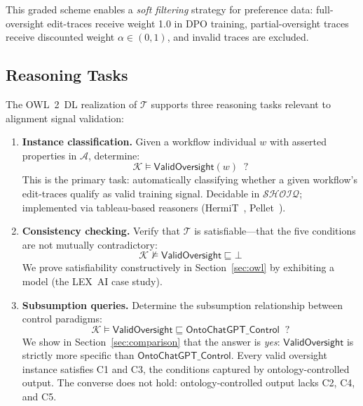 \documentclass[11pt]{article}
\newcommand{\DL}{\ensuremath{\mathcal{SHOIQ}}\xspace}
\newcommand{\TBox}{\ensuremath{\mathcal{T}}\xspace}
\newcommand{\ABox}{\ensuremath{\mathcal{A}}\xspace}
\newcommand{\KB}{\ensuremath{\mathcal{K}}\xspace}
\newcommand{\sqsub}{\sqsubseteq}
\begin{document}
This graded scheme enables a \emph{soft filtering} strategy for preference data: full-oversight edit-traces receive weight 1.0 in DPO training, partial-oversight traces receive discounted weight $\alpha \in (0, 1)$, and invalid traces are excluded.

\subsection{Reasoning Tasks}
\label{sec:reasoning}

The OWL~2~DL realization of \TBox supports three reasoning tasks relevant to alignment signal validation:

\begin{enumerate}[label=\textbf{R\arabic*.},leftmargin=2.5em]

\item \textbf{Instance classification.}
Given a workflow individual $w$ with asserted properties in \ABox, determine:
\begin{equation}
  \KB \models \mathsf{ValidOversight}(w) \;\; ?
\end{equation}
This is the primary task: automatically classifying whether a given workflow's edit-traces qualify as valid training signal.
Decidable in \DL; implemented via tableau-based reasoners (HermiT~\citep{glimm2014hermit}, Pellet~\citep{sirin2007pellet}).

\item \textbf{Consistency checking.}
Verify that \TBox is satisfiable---that the five conditions are not mutually contradictory:
\begin{equation}
  \KB \not\models \mathsf{ValidOversight} \sqsub \bot
\end{equation}
We prove satisfiability constructively in Section~\ref{sec:owl} by exhibiting a model (the LEX~AI case study).

\item \textbf{Subsumption queries.}
Determine the subsumption relationship between control paradigms:
\begin{equation}
  \KB \models \mathsf{ValidOversight} \sqsub \mathsf{OntoChatGPT\_Control} \;\; ?
\end{equation}
We show in Section~\ref{sec:comparison} that the answer is \emph{yes}: $\mathsf{ValidOversight}$ is strictly more specific than $\mathsf{OntoChatGPT\_Control}$.
Every valid oversight instance satisfies C1 and C3, the conditions captured by ontology-controlled output.
The converse does not hold: ontology-controlled output lacks C2, C4, and C5.

\end{enumerate}
\end{document}
